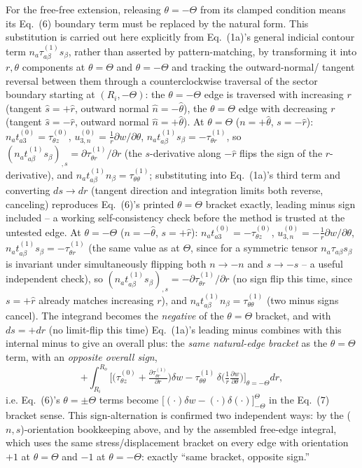 \documentclass[11pt]{article}
\begin{document}
For the free-free extension, releasing $\theta=-\Theta$ from its clamped
condition means its Eq.~(6) boundary term must be replaced by the natural
form. This substitution is carried out here explicitly from Eq.~(1a)'s
general indicial contour term $n_a\tau^{(1)}_{a\beta}s_\beta$, rather than
asserted by pattern-matching, by transforming it into $r,\theta$ components
at $\theta=\Theta$ and $\theta=-\Theta$ and tracking the outward-normal/
tangent reversal between them through a counterclockwise traversal of the
sector boundary starting at $(R_i,-\Theta)$: the $\theta=-\Theta$ edge is
traversed with increasing $r$ (tangent $\hat s=+\hat r$, outward normal
$\hat n=-\hat\theta$), the $\theta=\Theta$ edge with decreasing $r$ (tangent
$\hat s=-\hat r$, outward normal $\hat n=+\hat\theta$). At $\theta=\Theta$
($n=+\hat\theta$, $s=-\hat r$): $n_a t^{(0)}_{a3}=\tau^{(0)}_{\theta z}$,
$u^{(0)}_{3,n}=\tfrac1r\partial w/\partial\theta$,
$n_a t^{(1)}_{a\beta}s_\beta=-\tau^{(1)}_{\theta r}$, so
$(n_a t^{(1)}_{a\beta}s_\beta)_{,s}=\partial\tau^{(1)}_{\theta r}/\partial r$
(the $s$-derivative along $-\hat r$ flips the sign of the $r$-derivative),
and $n_a t^{(1)}_{a\beta}n_\beta=\tau^{(1)}_{\theta\theta}$; substituting
into Eq.~(1a)'s third term and converting $ds\to dr$ (tangent direction and
integration limits both reverse, canceling) reproduces Eq.~(6)'s printed
$\theta=\Theta$ bracket exactly, leading minus sign included -- a working
self-consistency check before the method is trusted at the untested edge.
At $\theta=-\Theta$ ($n=-\hat\theta$, $s=+\hat r$):
$n_a t^{(0)}_{a3}=-\tau^{(0)}_{\theta z}$,
$u^{(0)}_{3,n}=-\tfrac1r\partial w/\partial\theta$,
$n_a t^{(1)}_{a\beta}s_\beta=-\tau^{(1)}_{\theta r}$ (the same value as at
$\Theta$, since for a symmetric tensor $n_a\tau_{a\beta}s_\beta$ is
invariant under simultaneously flipping both $n\to-n$ and $s\to-s$ -- a
useful independent check), so
$(n_a t^{(1)}_{a\beta}s_\beta)_{,s}=-\partial\tau^{(1)}_{\theta r}/\partial r$
(no sign flip this time, since $s=+\hat r$ already matches increasing $r$),
and $n_a t^{(1)}_{a\beta}n_\beta=\tau^{(1)}_{\theta\theta}$ (two minus signs
cancel). The integrand becomes the \emph{negative} of the $\theta=\Theta$
bracket, and with $ds=+dr$ (no limit-flip this time) Eq.~(1a)'s leading
minus combines with this internal minus to give an overall plus: the
\emph{same natural-edge bracket} as the $\theta=\Theta$ term, with an
\emph{opposite overall sign},
\begin{equation}
+\int_{R_i}^{R_o}\!\Big[\big(\tau^{(0)}_{\theta z}
+\tfrac{\partial\tau^{(1)}_{\theta r}}{\partial r}\big)\delta w
-\tau^{(1)}_{\theta\theta}\,\delta\big(\tfrac1r\tfrac{\partial w}{\partial\theta}\big)\Big]_{\theta=-\Theta}dr,
\tag{B.3}
\end{equation}
i.e. Eq.~(6)'s $\theta=\pm\Theta$ terms become
$\big[(\cdot)\delta w-(\cdot)\delta(\cdot)\big]_{-\Theta}^{\Theta}$ in the
Eq.~(7) bracket sense. This sign-alternation is confirmed two independent
ways: by the ($n,s$)-orientation bookkeeping above, and by the assembled
free-edge integral, which uses the same stress/displacement bracket on
every edge with orientation $+1$ at $\theta=\Theta$ and $-1$ at
$\theta=-\Theta$: exactly ``same bracket, opposite sign.''
\end{document}
